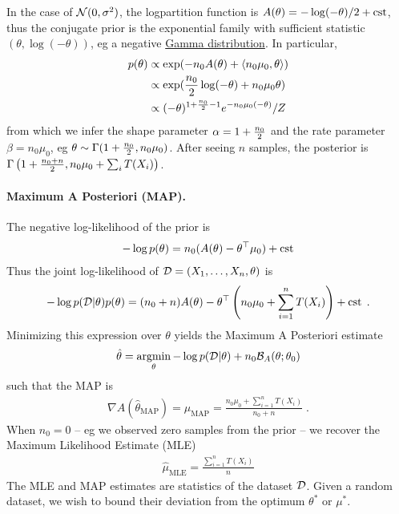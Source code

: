 \documentclass{article}
\newcommand{\logpart}{A}
\newcommand{\bregman}{\cB_\logpart}
\newcommand{\natp}{\theta}
\newcommand{\meanp}{\mu}
\begin{document}
\begin{example}
In the case of $\cN(0,\sigma^2)$, the logpartition function is $\logpart(\natp) = -\log(-\natp) /2 + \cst$, thus the conjugate prior is the exponential family with sufficient statistic $(\natp, \log(-\natp) )$, eg a negative \href{https://en.wikipedia.org/wiki/Gamma_distribution}{Gamma distribution}.
In particular,
\begin{align}
	p(\natp) 
	&\propto 
    \exp( -n_0 \logpart (\natp) 
    + \langle n_0 \mu_0, \natp \rangle ) \\
    &\propto \exp( \half[n_0] \log(-\natp) + n_0\mu_0 \natp ) \\
	&\propto (-\natp)^{1 + \half[n_0] -1 } e^{-n_0 \mu_0 (-\natp)} / Z
\end{align}
from which we infer the shape parameter $\alpha=1 + \half[n_0]$ and the rate parameter $\beta = n_0 \mu_0$, eg $\natp \sim \Gamma (1+\half[n_0] , n_0 \mu_0)$. After seeing $n$ samples, the posterior is $\Gamma\left(1+\half[n_0+n] , n_0 \mu_0 + \sum_i T(X_i) \right)$.
\end{example}

\paragraph{Maximum A Posteriori (MAP).}
The negative log-likelihood of the prior is
\begin{align*}
    -\log p(\natp) = n_0 (\logpart(\natp)  - \natp^\top \meanp_0 ) + \cst
\end{align*}
Thus the joint log-likelihood of $\cD =(X_1,\dots,X_n,\natp)$ is
\begin{align}
    -\log p(\cD|\natp)p(\natp) 
    = (n_0+n) \logpart (\natp) 
    - \theta^\top \left(n_0 \meanp_0 + \sum_{i=1}^n T(X_i) \right) + \cst \; .
\end{align}
Minimizing this expression over $\natp$ yields the Maximum A Posteriori estimate
\begin{align}
    \hat \natp = \argmin_\natp -\log p(\cD|\natp) + n_0 \bregman(\natp ; \natp_0)
\end{align}
such that the MAP is
\begin{align}
    \nabla \logpart(\hat \natp_\text{MAP}) = \hat \meanp_\text{MAP}
    = \frac{n_0 \meanp_0 + \sum_{i=1}^n T(X_i) }{n_0+n} \; .
\end{align}
When $n_0=0$ -- eg we observed zero samples from the prior -- we recover the Maximum Likelihood Estimate (MLE)
\begin{align}
	\hat \mu_\text{MLE} = \frac{\sum_{i=1}^n T(X_i)}{n}
\end{align}
The MLE and MAP estimates are statistics of the dataset $\cD$. Given a random dataset, we wish to bound their deviation from the optimum $\natp^*$ or $\meanp^*$.
\end{document}
